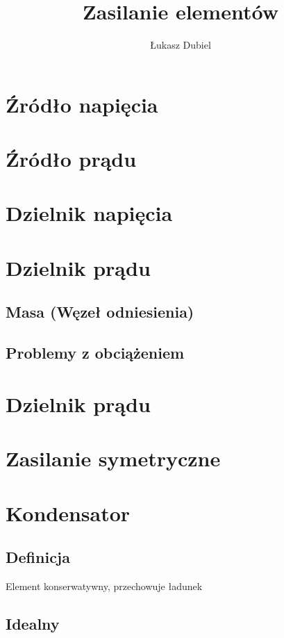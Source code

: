 \documentclass[11pt]{article}
\author{Łukasz Dubiel}
\title{Zasilanie elementów}
\begin{document}
\maketitle

\section{Źródło napięcia}


\section{Źródło prądu}

\section{Dzielnik napięcia}

\section{Dzielnik prądu}

\subsection{Masa (Węzeł odniesienia)}

\subsection{Problemy z obciążeniem}

\section{Dzielnik prądu}

\section{Zasilanie symetryczne}

\section{Kondensator}

\subsection{Definicja}
Element konserwatywny, przechowuje ładunek

\subsection{Idealny}
\end{document}

